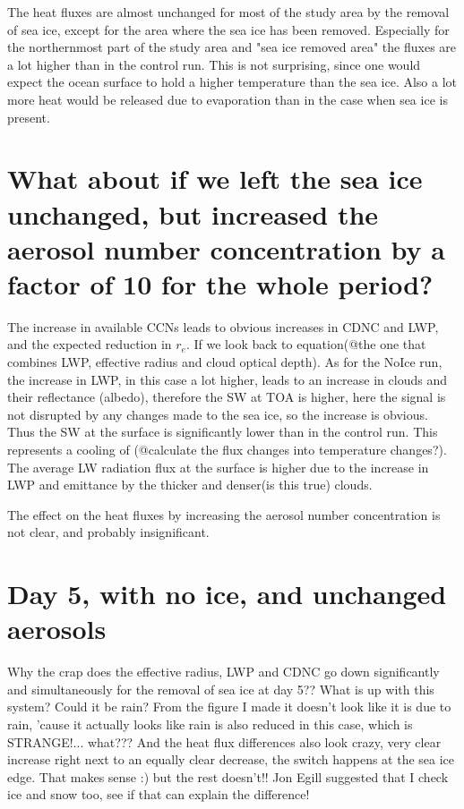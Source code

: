 The heat fluxes are almost unchanged for most of the study area by the removal of sea ice, except for the area where the sea ice has been removed. Especially for the northernmost part of the study area and "sea ice removed area" the fluxes are a lot higher than in the control run. This is not surprising, since one would expect the ocean surface to hold a higher temperature than the sea ice. Also a lot more heat would be released due to evaporation than in the case when sea ice is present.

\section{What about if we left the sea ice unchanged, but increased the aerosol number concentration by a factor of 10 for the whole period?}
The increase in available CCNs leads to obvious increases in CDNC and LWP, and the expected reduction in $r_e$. If we look back to equation(@the one that combines LWP, effective radius and cloud optical depth). As for the NoIce run, the increase in LWP, in this case a lot higher, leads to an increase in clouds and their reflectance (albedo), therefore the SW at TOA is higher, here the signal is not disrupted by any changes made to the sea ice, so the increase is obvious. Thus the SW at the surface is significantly lower than in the control run. This represents a cooling of (@calculate the flux changes into temperature changes?). The average LW radiation flux at the surface is higher due to the increase in LWP and emittance by the thicker and denser(is this true) clouds.

The effect on the heat fluxes by increasing the aerosol number concentration is not clear, and probably insignificant.

\section{Day 5, with no ice, and unchanged aerosols}
Why the crap does the effective radius, LWP and CDNC go down significantly and simultaneously for the removal of sea ice at day 5?? What is up with this system? Could it be rain? From the figure I made it doesn't look like it is due to rain, 'cause it actually looks like rain is also reduced in this case, which is STRANGE!... what??? And the heat flux differences also look crazy, very clear increase right next to an equally clear decrease, the switch happens at the sea ice edge. That makes sense :) but the rest doesn't!!
Jon Egill suggested that I check ice and snow too, see if that can explain the difference!


